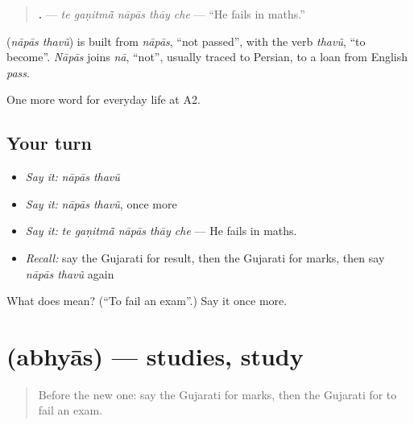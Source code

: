\begin{quote}
\textbf{    .} — \emph{te gaṇitmā̃ nāpās thāy che} — \textquotedblleft{}He fails in maths.\textquotedblright{}
\end{quote}

\begin{cousinweb}
\textbf{ } (\emph{nāpās thavũ}) is built from \emph{nāpās}, \textquotedblleft{}not passed\textquotedblright{}, with the verb \emph{thavũ}, \textquotedblleft{}to become\textquotedblright{}. \emph{Nāpās} joins \emph{nā}, \textquotedblleft{}not\textquotedblright{}, usually traced to Persian, to a loan from English \emph{pass}.
\end{cousinweb}

\begin{grammarlens}[title={What you've built}]
One more word for everyday life at A2.
\end{grammarlens}

\subsection*{Your turn}
\begin{itemize}
\raggedright
  \item \emph{Say it:} \emph{nāpās thavũ}
  \item \emph{Say it:} \emph{nāpās thavũ}, once more
  \item \emph{Say it:} \emph{te gaṇitmā̃ nāpās thāy che} — He fails in maths.
  \item \emph{Recall:} say the Gujarati for result, then the Gujarati for marks, then say \emph{nāpās thavũ} again
\end{itemize}

\begin{tcolorbox}[breakable,colback=teal!4,colframe=teal!35!black,title={Before you move on}]
What does   mean? (\textquotedblleft{}To fail an exam\textquotedblright{}.) Say it once more.
\end{tcolorbox}
\section[\texorpdfstring{\gu{અભ્યાસ} (abhyās)}{અભ્યાસ (abhyās)}]{ (abhyās) — studies, study}

\label{lesson:GU-C246-abhyas}



\begin{quote}
Before the new one: say the Gujarati for marks, then the Gujarati for to fail an exam.
\end{quote}


